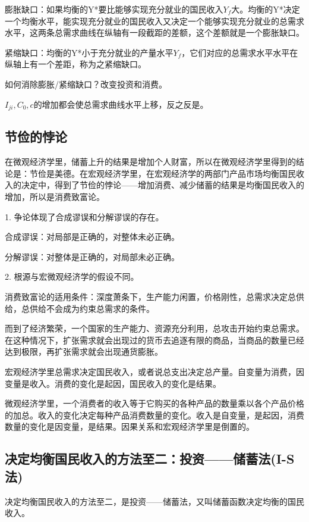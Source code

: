 \documentclass{article}
\begin{document}
膨胀缺口：如果均衡的Y*要比能够实现充分就业的国民收入$ Y_f $大。均衡的Y*决定一个均衡水平，能实现充分就业的国民收入又决定一个能够实现充分就业的总需求水平，这两条总需求曲线在纵轴有一段截距的差额，这个差额就是一个膨胀缺口。

紧缩缺口：均衡的Y*小于充分就业的产量水平$ Y_f $，它们对应的总需求水平水平在纵轴上有一个差距，称为之紧缩缺口。

如何消除膨胀/紧缩缺口？改变投资和消费。

$ I_{ji},C_0,c $的增加都会使总需求曲线水平上移，反之反是。

\subsection{节俭的悖论}
在微观经济学里，储蓄上升的结果是增加个人财富，所以在微观经济学里得到的结论是：节俭是美德。在宏观经济学里，在宏观经济学的两部门产品市场均衡国民收入的决定中，得到了节俭的悖论——增加消费、减少储蓄的结果是均衡国民收入的增加，所以是消费致富论。

\hspace*{\fill}

1. 争论体现了合成谬误和分解谬误的存在。

合成谬误：对局部是正确的，对整体未必正确。

分解谬误：对整体是正确的，对局部未必正确。

\hspace*{\fill}

2. 根源与宏微观经济学的假设不同。

消费致富论的适用条件：深度萧条下，生产能力闲置，价格刚性，总需求决定总供给，总供给不会成为约束总需求的条件。

而到了经济繁荣，一个国家的生产能力、资源充分利用，总攻击开始约束总需求。在这种情况下，扩张需求就会出现过的货币去追逐有限的商品，当商品的数量已经达到极限，再扩张需求就会出现通货膨胀。

宏观经济学里总需求决定国民收入，或者说总支出决定总产量。自变量为消费，因变量是收入。消费的变化是起因，国民收入的变化是结果。

微观经济学里，一个消费者的收入等于它购买的各种产品的数量乘以各个产品价格的加总。收入的变化决定每种产品消费数量的变化。收入是自变量，是起因，消费数量的变化是因变量，是结果。因果关系和宏观经济学里是倒置的。

\subsection{决定均衡国民收入的方法至二：投资——储蓄法(I-S法)}
决定均衡国民收入的方法至二，是投资——储蓄法，又叫储蓄函数决定均衡的国民收入。
\end{document}
